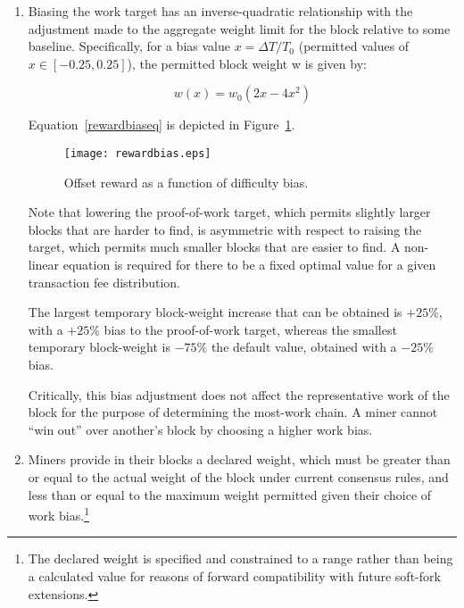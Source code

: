 \begin{enumerate}
\begin{enumerate}
  \item

    Biasing the work target has an inverse-quadratic relationship with
    the adjustment made to the aggregate weight limit for the block
    relative to some baseline.  Specifically, for a bias value $x =
    \Delta T / T_0$ (permitted values of $x \in [-0.25, 0.25]$), the
    permitted block weight w is given by:

    \begin{equation} \label{rewardbiaseq}
      w(x) = w_0(2x - 4x^2)
    \end{equation}

    Equation~\eqref{rewardbiaseq} is depicted in
    Figure~\ref{rewardbiasfig}.


\begin{figure}
  \centering
  \texttt{[image: rewardbias.eps]}
  \caption{Offset reward as a function of difficulty bias.}
  \label{rewardbiasfig}
\end{figure}

Note that lowering the proof-of-work target, which permits slightly
larger blocks that are harder to find, is asymmetric with respect to
raising the target, which permits much smaller blocks that are easier
to find.  A non-linear equation is required for there to be a fixed
optimal value for a given transaction fee distribution.

The largest temporary block-weight increase that can be obtained is
+$25\%$, with a $+25\%$ bias to the proof-of-work target, whereas the
smallest temporary block-weight is $-75\%$ the default value, obtained
with a $-25\%$ bias.

Critically, this bias adjustment does not affect the representative
work of the block for the purpose of determining the most-work
chain. A miner cannot ``win out'' over another's block by choosing a
higher work bias.


  \item

    Miners provide in their blocks a declared weight, which must be
    greater than or equal to the actual weight of the block under
    current consensus rules, and less than or equal to the maximum
    weight permitted given their choice of work bias.\footnote{The
    declared weight is specified and constrained to a range rather
    than being a calculated value for reasons of forward compatibility
    with future soft-fork extensions.}


\end{enumerate}
\end{enumerate}
